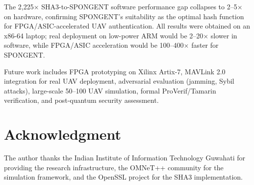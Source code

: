 \documentclass[conference]{IEEEtran}
\begin{document}
The 2,225$\times$ SHA3-to-SPONGENT software performance gap collapses to 2--5$\times$ on hardware, confirming SPONGENT's suitability as the optimal hash function for FPGA/ASIC-accelerated UAV authentication. All results were obtained on an x86-64 laptop; real deployment on low-power ARM would be 2--20$\times$ slower in software, while FPGA/ASIC acceleration would be 100--400$\times$ faster for SPONGENT.

Future work includes FPGA prototyping on Xilinx Artix-7, MAVLink 2.0 integration for real UAV deployment, adversarial evaluation (jamming, Sybil attacks), large-scale 50--100 UAV simulation, formal ProVerif/Tamarin verification, and post-quantum security assessment.

\section*{Acknowledgment}

The author thanks the Indian Institute of Information Technology Guwahati for providing the research infrastructure, the OMNeT++ community for the simulation framework, and the OpenSSL project for the SHA3 implementation.
\end{document}
